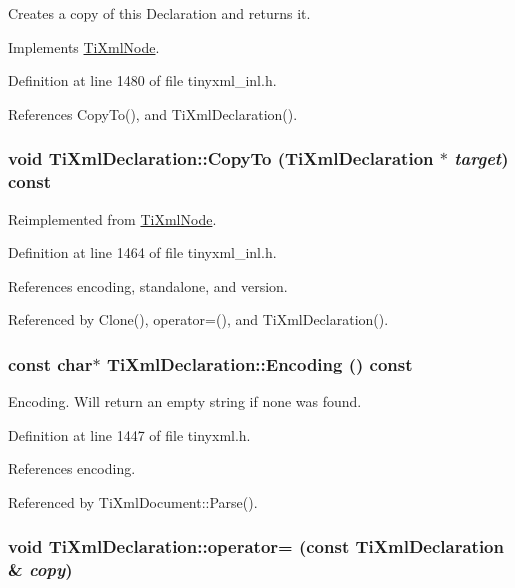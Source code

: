 Creates a copy of this Declaration and returns it. 

Implements \hyperlink{class_ti_xml_node_a4508cc3a2d7a98e96a54cc09c37a78a4}{TiXmlNode}.

Definition at line 1480 of file tinyxml\_\-inl.h.

References CopyTo(), and TiXmlDeclaration().\hypertarget{class_ti_xml_declaration_a9d08959f935421a593032bd3efb30c38}{
\subsubsection[{CopyTo}]{\setlength{\rightskip}{0pt plus 5cm}void TiXmlDeclaration::CopyTo ({\bf TiXmlDeclaration} $\ast$ {\em target}) const}}
\label{class_ti_xml_declaration_a9d08959f935421a593032bd3efb30c38}


Reimplemented from \hyperlink{class_ti_xml_node_ab6056978923ad8350fb5164af32d8038}{TiXmlNode}.

Definition at line 1464 of file tinyxml\_\-inl.h.

References encoding, standalone, and version.

Referenced by Clone(), operator=(), and TiXmlDeclaration().\hypertarget{class_ti_xml_declaration_a5d974231f9e9a2f0542f15f3a46cdb76}{
\subsubsection[{Encoding}]{\setlength{\rightskip}{0pt plus 5cm}const char$\ast$ TiXmlDeclaration::Encoding () const}}
\label{class_ti_xml_declaration_a5d974231f9e9a2f0542f15f3a46cdb76}


Encoding. Will return an empty string if none was found. 

Definition at line 1447 of file tinyxml.h.

References encoding.

Referenced by TiXmlDocument::Parse().\hypertarget{class_ti_xml_declaration_a0fedc57539af9049be8db2d7d9d9ba33}{
\subsubsection[{operator=}]{\setlength{\rightskip}{0pt plus 5cm}void TiXmlDeclaration::operator= (const {\bf TiXmlDeclaration} \& {\em copy})}}
\label{class_ti_xml_declaration_a0fedc57539af9049be8db2d7d9d9ba33}


